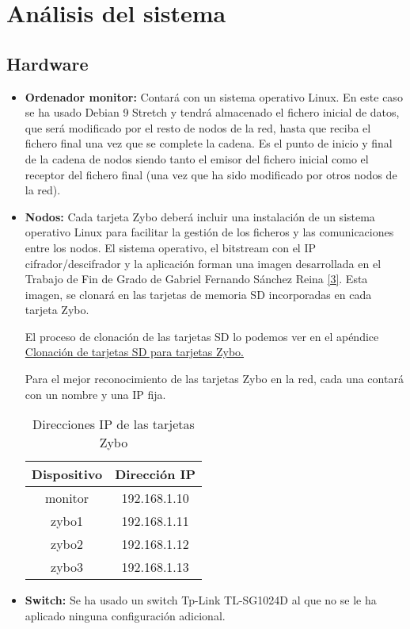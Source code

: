 \section{Análisis del sistema}
\subsection{Hardware}
\begin{itemize}
	\item \textbf{Ordenador monitor:} Contará con un sistema operativo Linux. En este caso se ha usado Debian 9 Stretch y tendrá almacenado el fichero inicial de datos, que será modificado por el resto de nodos de la red, hasta que reciba el fichero final una vez que se complete la cadena. Es el punto de inicio y final de la cadena de nodos siendo tanto el emisor del fichero inicial como el receptor del fichero final (una vez que ha sido modificado por otros nodos de la red).
	\item \textbf{Nodos:} Cada tarjeta Zybo deberá incluir una instalación de un sistema operativo Linux para facilitar la gestión de los ficheros y las comunicaciones entre los nodos. El sistema operativo, el bitstream con el IP cifrador/descifrador y la aplicación forman una imagen desarrollada en el Trabajo de Fin de Grado de Gabriel Fernando Sánchez Reina \hyperlink{3}{[3]}. Esta imagen, se clonará en las tarjetas de memoria SD incorporadas en cada tarjeta Zybo.
	
	El proceso de clonación de las tarjetas SD lo podemos ver en el apéndice \hyperlink{InstalacionLinux}{Clonación de tarjetas SD para tarjetas Zybo.}
	
	Para el mejor reconocimiento de las tarjetas Zybo en la red, cada una contará con un nombre y una IP fija.
	\begin{table}[h]
		\centering
		\begin{tabular}{|c|c|}
			\hline
			\textbf{Dispositivo} & \textbf{Dirección IP} \\ \hline
			monitor & 192.168.1.10 \\ \hline
			zybo1 & 192.168.1.11 \\ \hline
			zybo2 & 192.168.1.12 \\ \hline
			zybo3 & 192.168.1.13 \\ \hline
		\end{tabular}
		\caption{Direcciones IP de las tarjetas Zybo}
		\label{Direcciones IP de las tarjetas Zybo}
	\end{table}
	\item \textbf{Switch:} Se ha usado un switch Tp-Link TL-SG1024D al que no se le ha aplicado ninguna configuración adicional.
\end{itemize}




